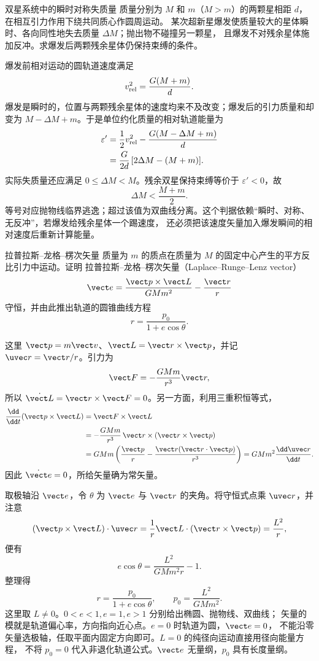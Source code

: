 \begin{origexamplebox}{双星系统中的瞬时对称失质量}
\label{ch11:ex:04}
质量分别为 $M$ 和 $m$（$M>m$）的两颗星相距 $d$，在相互引力作用下绕共同质心作圆周运动。
某次超新星爆发使质量较大的星体瞬时、各向同性地失去质量 $\Delta M$；抛出物不碰撞另一颗星，
且爆发不对残余星体施加反冲。求爆发后两颗残余星体仍保持束缚的条件。
\end{origexamplebox}
\begin{xesolution}
爆发前相对运动的圆轨道速度满足
\[
 v_{\rm rel}^2=\frac{G(M+m)}{d}.
\]
爆发是瞬时的，位置与两颗残余星体的速度均来不及改变；爆发后的引力质量和却变为
$M-\Delta M+m$。于是单位约化质量的相对轨道能量为
\begin{align*}
 \varepsilon'
 &=\frac12v_{\rm rel}^2-\frac{G(M-\Delta M+m)}{d}\\
 &=\frac{G}{2d}\,[2\Delta M-(M+m)].
\end{align*}
实际失质量还应满足 $0\le\Delta M<M$。残余双星保持束缚等价于 $\varepsilon'<0$，故
\[
 \boxed{\Delta M<\frac{M+m}{2}}.
\]
等号对应抛物线临界逃逸；超过该值为双曲线分离。这个判据依赖“瞬时、对称、无反冲”，若爆发给残余星体一个踢速度，
还必须把该速度矢量加入爆发瞬间的相对速度后重新计算能量。
\end{xesolution}

\begin{origexamplebox}{拉普拉斯--龙格--楞次矢量}
\label{ch11:ex:05}
质量为 $m$ 的质点在质量为 $M$ 的固定中心产生的平方反比引力中运动。证明
拉普拉斯--龙格--楞次矢量（Laplace--Runge--Lenz vector）
\[
 \vect e=\frac{\vect p\times\vect L}{GMm^2}-\frac{\vect r}{r}
\]
守恒，并由此推出轨道的圆锥曲线方程
\[
 r=\frac{p_0}{1+e\cos\theta}.
\]
\end{origexamplebox}
\begin{xesolution}
这里 $\vect p=m\vect v$、$\vect L=\vect r\times\vect p$，并记
$\uvec r=\vect r/r$。引力为
\[
 \vect F=-\frac{GMm}{r^3}\vect r,
\]
所以 $\dot{\vect L}=\vect r\times\vect F=0$。另一方面，利用三重积恒等式，
\begin{align*}
 \frac{\dd}{\dd t}(\vect p\times\vect L)
 &=\vect F\times\vect L\\
 &=-\frac{GMm}{r^3}\,
   \vect r\times(\vect r\times\vect p)\\
 &=GMm\left(\frac{\vect p}{r}
 -\frac{\vect r(\vect r\cdot\vect p)}{r^3}\right)
 =GMm^2\frac{\dd\uvec r}{\dd t}.
\end{align*}
因此 $\dot{\vect e}=0$，所给矢量确为常矢量。

取极轴沿 $\vect e$，令 $\theta$ 为 $\vect e$ 与 $\vect r$ 的夹角。将守恒式点乘 $\uvec r$，并注意
\[
 (\vect p\times\vect L)\cdot\uvec r
 =\frac1r\vect L\cdot(\vect r\times\vect p)=\frac{L^2}{r},
\]
便有
\[
 e\cos\theta=\frac{L^2}{GMm^2r}-1.
\]
整理得
\[
 \boxed{r=\frac{p_0}{1+e\cos\theta}},
 \qquad
 \boxed{p_0=\frac{L^2}{GMm^2}}.
\]
这里取 $L\ne0$。$0<e<1,e=1,e>1$ 分别给出椭圆、抛物线、双曲线；
矢量的模就是轨道偏心率，方向指向近心点。$e=0$ 时轨道为圆，$\vect e=0$，
不能沿零矢量选极轴，任取平面内固定方向即可。$L=0$ 的纯径向运动直接用径向能量方程，
不将 $p_0=0$ 代入非退化轨道公式。$\vect e$ 无量纲，$p_0$ 具有长度量纲。
\end{xesolution}

